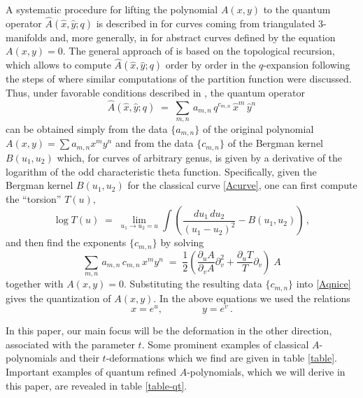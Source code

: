\documentclass[hyper,letterpaper]{JHEP3}
\newcommand{\be}{\begin{equation}}
\newcommand{\ee}{\end{equation}}
\renewcommand{\hat}{\widehat}
\begin{document}
A systematic procedure for lifting the polynomial $A(x,y)$ to the quantum operator $\hat A (\hat x, \hat y; q)$
is described in \cite{Tudor} for curves coming from triangulated 3-manifolds and, more generally, in \cite{abmodel}
for abstract curves defined by the equation $A(x,y)=0$. The general approach of \cite{abmodel} is based
on the topological recursion, which allows to compute $\hat A (\hat x, \hat y; q)$
order by order in the $q$-expansion following the steps of \cite{Mironov,Marino:2006hs,eyn-or,BKMP,DijkgraafFuji-2}
where similar computations of the partition function were discussed.
Thus, under favorable conditions described in \cite{abmodel}, the quantum operator
\be
\hat A (\hat x, \hat y; q) \; = \; \sum_{m,n}\, a_{m,n}\, q^{c_{m,n}}\, \hat x^m\, \hat y^n
\label{Aqnice}
\ee
can be obtained simply from the data $\{ a_{m,n} \}$ of the original polynomial $A(x,y) = \sum a_{m,n} x^m y^n$
and from the data $\{ c_{m,n} \}$ of the Bergman kernel $B(u_1,u_2)$ which, for curves of arbitrary genus,
is given by a derivative of the logarithm of the odd characteristic theta function.
Specifically,
given the Bergman kernel $B(u_1,u_2)$ for the classical curve \eqref{Acurve},
one can first compute the ``torsion'' $T(u)$,
\be
\log T (u) \; = \; \lim_{u_1 \to u_2=u} \int
\left( \frac{du_1 \, du_2}{(u_1 - u_2)^2} - B(u_1,u_2) \right) \,,
\ee
and then find the exponents $\{ c_{m,n} \}$ by solving
\be
\sum_{m,n}\, a_{m,n}\, c_{m,n}\, x^m y^n \; = \;
\frac{1}{2} \left( \frac{\partial_u A}{\partial_v A} \partial_v^2 + \frac{\partial_u T}{T} \partial_v \right) \; A
\ee
together with $A(x,y) = 0$. 
Substituting the resulting data $\{ c_{m,n} \}$ into \eqref{Aqnice} gives the quantization of $A(x,y)$.
In the above equations we used the relations
\be
x = e^u, \qquad  \qquad y = e^v \,.  \label{xuyv}
\ee


In this paper, our main focus will be the deformation in the other direction, associated with the parameter $t$.
Some prominent examples of classical $A$-polynomials and their
$t$-deformations which we find are given in table \ref{table}. Important
examples of quantum refined $A$-polynomials, which we will derive in this paper, are revealed in table \ref{table-qt}.
\end{document}
